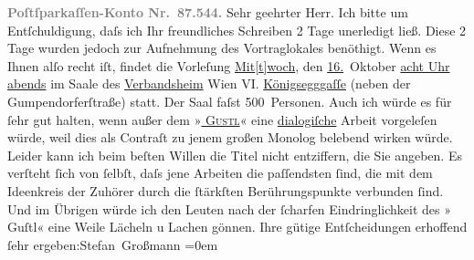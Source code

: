 \begin{ledgroupsized}[t]{13cm}
           \pstart
           \textcolor{gray}{\textbf{Poſtſparkaſſen-Konto Nr. 87.544.}}\pend
           \pstart\center{}Sehr geehrter Herr.\pend\pstart
           Ich bitte um Entſchuldigung, daſs ich Ihr freundliches Schreiben 2 Tage unerledigt
               ließ.\pend
           \pstart
           Diese 2 Tage wurden jedoch zur Aufnehmung des Vortraglokales benöthigt. Wenn es Ihnen
               alſo recht iſt, findet die Vorleſung\pend
           \pstart
           \centering{}\uline{Mit{[}t{]}woch}, den \uline{16.} Oktober\pend
           \pstart
           \noindent{}\centering{}\uline{acht Uhr abends}\pend
           \pstart
           \noindent{}im Saale des \uline{Verbandsheim}{ }Wien VI. \uline{Königsegggaſſe} (neben der Gumpendorferſtraße) statt. Der
               Saal faſst 500 Personen.\pend
           \pstart
           Auch ich würde es für ſehr gut halten, wenn außer {\pb}dem »\textsc{\uline{\label{T_L01717_1v}\label{T_L01717_1h}}}\textsc{\uline{{ }Gustl}}« eine \uline{dialogiſche} Arbeit vorgeleſen würde, weil
               dies als Contraſt zu jenem großen  Monolog
               belebend wirken würde. Leider kann ich beim beſten Willen die  Titel nicht entziffern, die Sie angeben.\pend
           \pstart
           Es verſteht ſich von ſelbſt, daſs jene Arbeiten die paſſendsten ſind, die mit dem
               Ideenkreis der Zuhörer \introOben{}durch\introOben{} die ſtärkſten  Berührungspunkte verbunden ſind.\pend
           \pstart
           Und im Übrigen würde ich den Leuten nach der ſcharfen Eindringlichkeit des »\label{T_L01717_2v}\label{T_L01717_2h} Guſtl«
               eine  Weile Lächeln u Lachen gönnen.\pend
           \pstart
           Ihre gütige Entſcheidungen erhoffend{\\[\baselineskip]}ſehr ergeben:\spacefill\mbox{Stefan
                  Großmann}\pend
           \leftskip=0em{}\endnumbering{}\end{ledgroupsized}  \newcommand{\dateiname}{L01717}\newcommand{\titel}{Stefan Großmann an Arthur Schnitzler, 7. 10. 1907}\newcommand{\editorInnen}{ Martin Anton Müller und Gerd-Hermann Susen}
      